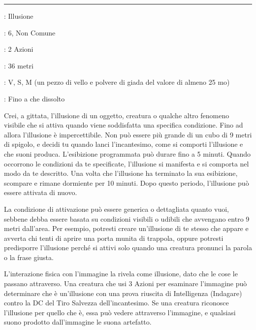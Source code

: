 \begin{multicols}{2}
\smallskip\noindent\rule{\linewidth}{2pt} \hypertarget{Illusione Programmata}{}\medskip{}
\noindent
\begin{description}[noitemsep, topsep=0pt, parsep=0pt, partopsep=0pt, leftmargin=0cm, labelwidth=2.8cm]
	\item[\textbf{Lista di Magia}]: Illusione
	\item[\textbf{Livello}]: 6, Non Comune
	\item[\textbf{T. di Lancio}]: 2 Azioni
	\item[\textbf{Gittata}]: 36 metri
	\item[\textbf{Componenti}]: V, S, M (un pezzo di vello e polvere di giada del valore di almeno 25 mo)
	\item[\textbf{Durata}]: Fino a che dissolto
\end{description}

Crei, a gittata, l'illusione di un oggetto, creatura o qualche altro fenomeno visibile che si attiva quando viene soddisfatta una specifica condizione. Fino ad allora l'illusione è impercettibile. Non può essere più grande di un cubo di 9 metri di spigolo, e decidi tu quando lanci l'incantesimo, come si comporti l'illusione e che suoni produca. L'esibizione programmata può durare fino a 5 minuti. Quando occorrono le condizioni da te specificate, l'illusione si manifesta e si comporta nel modo da te descritto. Una volta che l'illusione ha terminato la sua esibizione, scompare e rimane dormiente per 10 minuti. Dopo questo periodo, l'illusione può essere attivata di nuovo.

La condizione di attivazione può essere generica o dettagliata quanto vuoi, sebbene debba essere basata su condizioni visibili o udibili che avvengano entro 9 metri dall'area. Per esempio, potresti creare un'illusione di te stesso che appare e avverta chi tenti di aprire una porta munita di trappola, oppure potresti predisporre l'illusione perché si attivi solo quando una creatura pronunci la parola o la frase giusta.

L'interazione fisica con l'immagine la rivela come illusione, dato che le cose le passano attraverso. Una creatura che usi 3 Azioni per esaminare l'immagine può determinare che è un'illusione con una prova riuscita di Intelligenza (Indagare) contro la DC del Tiro Salvezza dell'incantesimo. Se una creatura riconosce l'illusione per quello che è, essa può vedere attraverso l'immagine, e qualsiasi suono prodotto dall'immagine le suona artefatto.


\end{multicols}
